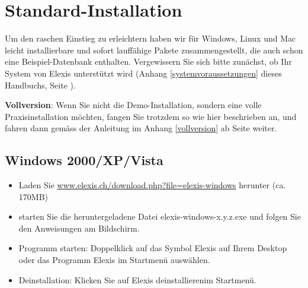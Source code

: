 
\section{Standard-Installation}
\label{easyistall}
Um den raschen Einstieg zu erleichtern haben wir für Windows, Linux und Mac leicht installierbare und sofort lauffähige Pakete zusammengestellt, die auch schon eine Beispiel-Datenbank enthalten.
Vergewissern Sie sich bitte zunächst, ob Ihr System von Elexis unterstützt wird (Anhang \ref{systemvoraussetzungen} dieses Handbuchs, Seite \pageref{systemvoraussetzungen}).\par
{}
\textbf{Vollversion}: Wenn Sie nicht die Demo-Installation, sondern eine volle Praxisinstallation möchten, fangen Sie trotzdem so wie hier beschrieben an, und fahren dann gemäss der Anleitung im Anhang \ref{vollversion} ab Seite \pageref{vollversion} weiter.
\subsection{Windows 2000/XP/Vista}
\begin{itemize}
	\item Laden Sie \href{http://www.elexis.ch/download.php?file=elexis-windows}{www.elexis.ch/down\-load.php?file=elexis-windows} herunter (ca. 170MB)
	\item starten Sie die heruntergeladene Datei elexis-windows-x.y.z.exe und folgen Sie den Anweisungen am Bildschirm.
    \item Programm starten: Doppelklick auf das Symbol \glqq Elexis\grqq{} auf Ihrem Desktop oder das Programm \glqq Elexis\grqq{} im Startmenü auswählen.
	\item Deinstallation: Klicken Sie auf \glqq Elexis deinstallieren\grqq im  Startmenü.
\end{itemize}

